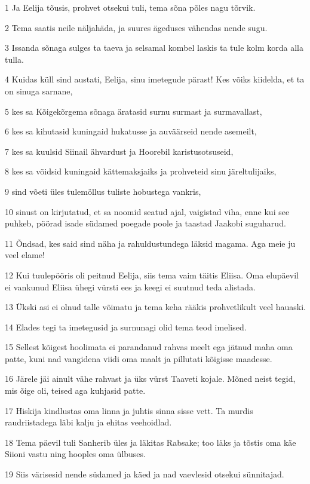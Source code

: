 \par 1 Ja Eelija tõusis, prohvet otsekui tuli, tema sõna põles nagu tõrvik.
\par 2 Tema saatis neile näljahäda, ja suures ägeduses vähendas nende sugu.
\par 3 Issanda sõnaga sulges ta taeva ja selsamal kombel laskis ta tule kolm korda alla tulla.
\par 4 Kuidas küll sind austati, Eelija, sinu imetegude pärast! Kes võiks kiidelda, et ta on sinuga sarnane,
\par 5 kes sa Kõigekõrgema sõnaga äratasid surnu surmast ja surmavallast,
\par 6 kes sa kihutasid kuningaid hukatusse ja auväärseid nende asemeilt,
\par 7 kes sa kuulsid Siinail ähvardust ja Hoorebil karistusotsuseid,
\par 8 kes sa võidsid kuningaid kättemaksjaiks ja prohveteid sinu järeltulijaiks,
\par 9 sind võeti üles tulemöllus tuliste hobustega vankris,
\par 10 sinust on kirjutatud, et sa noomid seatud ajal, vaigistad viha, enne kui see puhkeb, pöörad isade südamed poegade poole ja taastad Jaakobi suguharud.
\par 11 Õndsad, kes said sind näha ja rahuldustundega läksid magama. Aga meie ju veel elame!
\par 12 Kui tuulepööris oli peitnud Eelija, siis tema vaim täitis Eliisa. Oma elupäevil ei vankunud Eliisa ühegi vürsti ees ja keegi ei suutnud teda alistada.
\par 13 Ükski asi ei olnud talle võimatu ja tema keha rääkis prohvetlikult veel hauaski.
\par 14 Elades tegi ta imetegusid ja surnunagi olid tema teod imelised.
\par 15 Sellest kõigest hoolimata ei parandanud rahvas meelt ega jätnud maha oma patte, kuni nad vangidena viidi oma maalt ja pillutati kõigisse maadesse.
\par 16 Järele jäi ainult vähe rahvast ja üks vürst Taaveti kojale. Mõned neist tegid, mis õige oli, teised aga kuhjasid patte.
\par 17 Hiskija kindlustas oma linna ja juhtis sinna sisse vett. Ta murdis raudriistadega läbi kalju ja ehitas veehoidlad.
\par 18 Tema päevil tuli Sanherib üles ja läkitas Rabsake; too läks ja tõstis oma käe Siioni vastu ning hooples oma ülbuses.
\par 19 Siis värisesid nende südamed ja käed ja nad vaevlesid otsekui sünnitajad.
